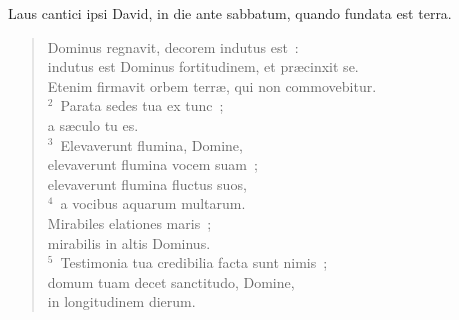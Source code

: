 \lettrine[lines=3,image=true,loversize=0.05,lraise=-0.03]{L}{}aus cantici ipsi David, in die ante sabbatum, quando fundata est terra. \begin{flushleft}\begin{verse}\vspace{6pt}Dominus regnavit, decorem indutus est~:\\ indutus est Dominus fortitudinem, et pr\ae cinxit se.\\ Etenim firmavit orbem terr\ae , qui non commovebitur.\\
${}^{2}$~Parata sedes tua ex tunc~;\\ a s\ae culo tu es.\\
${}^{3}$~Elevaverunt flumina, Domine,\\ elevaverunt flumina vocem suam~;\\ elevaverunt flumina fluctus suos,\\
${}^{4}$~a vocibus aquarum multarum.\\ Mirabiles elationes maris~;\\ mirabilis in altis Dominus.\\
${}^{5}$~Testimonia tua credibilia facta sunt nimis~;\\ domum tuam decet sanctitudo, Domine,\\ in longitudinem dierum.\end{verse}\end{flushleft}



